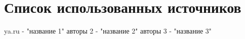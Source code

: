 \section{Список использованных источников}


 
\begin{thebibliography}{}
      ya.ru  -  "название 1"
      авторы 2  -  "название 2"
      авторы 3  -  "название 3"
    \cite{ya.ru}
\end{thebibliography}